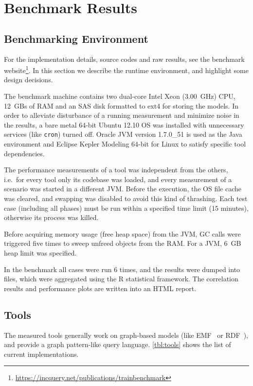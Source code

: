 \chapter{Benchmark Results}


\section{Benchmarking Environment}
\label{sec:environment}

For the implementation details, source codes and raw results, see the benchmark website\footnote{\url{https://incquery.net/publications/trainbenchmark}}. In this section we describe the runtime environment, and highlight some design decisions.

The benchmark machine contains two dual-core Intel Xeon (3.00~GHz) CPU, 12~GBs of RAM and an SAS disk formatted to ext4 for storing the models. In order to alleviate disturbance of a running measurement and minimize noise in the results, a bare metal 64-bit Ubuntu 12.10 OS was installed with unnecessary services (like \texttt{cron}) turned off. Oracle JVM version 1.7.0\_51 is used as the Java environment and Eclipse Kepler Modeling 64-bit for Linux to satisfy specific tool dependencies.

The performance measurements of a tool was independent from the others, i.e.\ for every tool only its codebase was loaded, and every measurement of a scenario was started in a different JVM. Before the execution, the OS file cache was cleared, and swapping was disabled to avoid this kind of thrashing. Each test case (including all phases) must be run within a specified time limit (15 minutes), otherwise its process was killed.

Before acquiring memory usage (free heap space) from the JVM, GC calls were triggered five times to sweep unfreed objects from the RAM. For a JVM, 6~GB heap limit was specified.

In the benchmark all cases were run 6 times, and the results were dumped into files, which were aggregated using the R statistical framework. The correlation results and performance plots are written into an HTML report.


\section{Tools}
\label{tools}
The measured tools generally work on graph-based models (like EMF~\cite{EMF} or RDF~\cite{RDF}), and provide a graph pattern-like query language. \autoref{tbl:tools} shows the list of current implementations.

